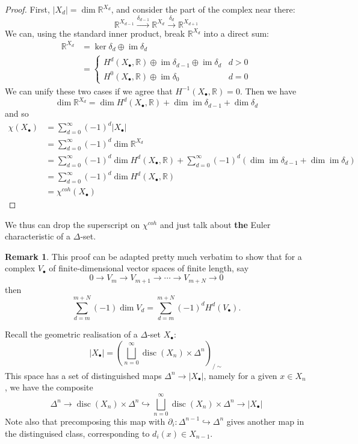 \documentclass{tufte-handout}
\def\into {\hookrightarrow}
\def\RR{\mathbb{R}}
\newcommand{\lecturenum}[1]{\marginnote{\color{red}Lecture #1}}
\DeclareMathOperator{\disc}{disc}
\DeclareMathOperator{\im}{im}
\theoremstyle{definition}
\newtheorem*{rem}{Remark}
\begin{document}
\begin{proof}
First, $|X_d| = \dim \RR^{X_d}$, and consider the part of the complex near there:
\[
	\RR^{X_{d-1}} \xrightarrow{\delta_{d-1}} \RR^{X_d} \xrightarrow{\delta_d} \RR^{X_{d+1}}
\] 
We can, using the standard inner product,  break $\RR^{X_d}$ into a direct sum:
\begin{align*}
\RR^{X_d}& = \ker\delta_d\oplus \im \delta_d\\
	 & = \begin{cases}
		H^d(X_\bullet,\RR) \oplus \im\delta_{d-1} \oplus \im\delta_d & d > 0\\
		H^0(X_\bullet,\RR) \oplus \im \delta_0 & d=0
	    \end{cases}
\end{align*}
We can unify these two cases if we agree that $H^{-1}(X_\bullet,\RR) = 0$. Then we have
\[
	\dim \RR^{X_d} = \dim H^d(X_\bullet,\RR) + \dim \im\delta_{d-1} + \dim\delta_d
\]
and so
\begin{align*}
\chi(X_\bullet) & = \sum_{d=0}^\infty (-1)^d |X_\bullet|\\
		& = \sum_{d=0}^\infty (-1)^d \dim \RR^{X_d}\\
		& = \sum_{d=0}^\infty (-1)^d \dim H^d(X_\bullet,\RR) + 
			\sum_{d=0}^\infty (-1)^d\left(\dim\im\delta_{d-1} + \dim\im\delta_d \right)\\
		& = \sum_{d=0}^\infty (-1)^d \dim H^d(X_\bullet,\RR) \\
		& = \chi^{coh}(X_\bullet)
\end{align*}
\end{proof}

We thus can drop the superscript on $\chi^{coh}$ and just talk about \textbf{the} Euler characteristic
of a $\Delta$-set.

\begin{rem}
This proof can be adapted pretty much verbatim to show that for a complex $V_\bullet$ of finite-dimensional 
vector spaces of finite length, say
\[
	0 \to V_m \to V_{m+1} \to \cdots \to V_{m+N} \to 0
\]
then
\[
	\sum_{d=m}^{m+N} (-1) \dim V_d = \sum_{d=m}^{m+N} (-1)^d H^d(V_\bullet).
\]
\end{rem}

Recall\lecturenum{26} the geometric realisation of a $\Delta$-set $X_\bullet$:
\[
	|X_\bullet| = \left(\bigsqcup_{n=0}^\infty \disc(X_n) \times \Delta^n\right)_{\big/\sim}
\]
This space has a set of distinguished maps $\Delta^n \to |X_\bullet|$, namely for a given $x\in X_n$, 
we have the composite
\[
	\Delta^n \to \disc(X_n) \times \Delta^n \into \bigsqcup_{n=0}^\infty \disc(X_n) \times \Delta^n \to |X_\bullet|
\]
Note also that precomposing this map with $\partial_i\colon \Delta^{n-1} \into \Delta^n$ gives another
map in the distinguised class, corresponding to $d_i(x) \in X_{n-1}$.
\end{document}
